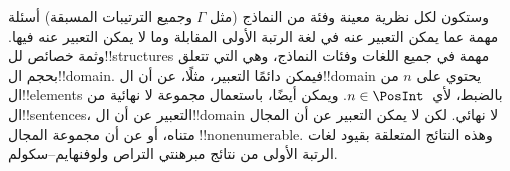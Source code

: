 \documentclass[../../../include/open-logic-section]{subfiles}
\begin{document}
وستكون لكل نظرية معينة وفئة من النماذج (مثل $\Gamma$ وجميع الترتيبات
المسبقة) أسئلة مهمة عما يمكن التعبير عنه في لغة الرتبة الأولى المقابلة
وما لا يمكن التعبير عنه فيها. وثمة خصائص لل!!{structure}s مهمة في
جميع اللغات وفئات النماذج، وهي التي تتعلق بحجم ال!!{domain}. فيمكن
دائمًا التعبير، مثلًا، عن أن ال!!{domain} يحتوي على $n$ من
ال!!{element}s بالضبط، لأي~$n \in \PosInt$. ويمكن أيضًا، باستعمال
مجموعة لا نهائية من ال!!{sentence}s، التعبير عن أن ال!!{domain} لا
نهائي. لكن لا يمكن التعبير عن أن المجال متناه، أو عن أن مجموعة
المجال !!{nonenumerable}. وهذه النتائج المتعلقة بقيود لغات الرتبة الأولى من
نتائج مبرهنتي التراص ولوفنهايم--سكولم.
\end{document}
